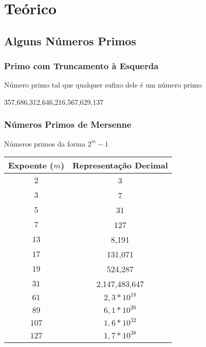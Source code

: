 \chapter{Teórico}

\section{Alguns Números Primos}

\subsection{Primo com Truncamento à Esquerda}

\large{Número primo tal que qualquer sufixo dele é um número primo}

\begin{center}
\LARGE{357,686,312,646,216,567,629,137}
\end{center}

\subsection{Números Primos de Mersenne}

\large{Números primos da forma $2^m-1$}

\begin{table}[h]
  \centering
  \begin{tabular}{|c|c|}
    \hline
    \textbf{Expoente ($m$)} & \textbf{Representação Decimal} \\
    \hline
    \(2\) & 3 \\
    \hline
    \(3\) & 7 \\
    \hline
    \(5\) & 31 \\
    \hline
    \(7\) & 127 \\
    \hline
    \(13\) & 8,191 \\
    \hline
    \(17\) & 131,071 \\
    \hline
    \(19\) & 524,287 \\
    \hline
    \(31\) & 2,147,483,647 \\
    \hline
    \(61\) & $2,3 * 10^{18}$ \\
    \hline
    \(89\) & $6,1 * 10^{26}$ \\
    \hline
    \(107\) & $1,6 * 10^{32}$ \\
    \hline
    \(127\) & $1,7 * 10^{38}$ \\
    \hline
  \end{tabular}
\end{table}

